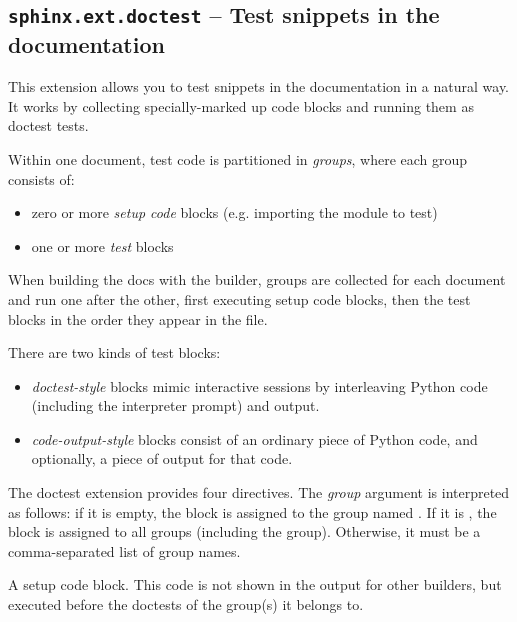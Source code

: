 \documentclass[letterpaper,10pt,english]{sphinxmanual}
\begin{document}
\subsection{\texttt{sphinx.ext.doctest} -- Test snippets in the documentation}
\label{ext/doctest:module-sphinx.ext.doctest}\label{ext/doctest:sphinx-ext-doctest-test-snippets-in-the-documentation}\label{ext/doctest::doc}
This extension allows you to test snippets in the documentation in a natural
way.  It works by collecting specially-marked up code blocks and running them as
doctest tests.

Within one document, test code is partitioned in \emph{groups}, where each group
consists of:
\begin{itemize}
\item {} 
zero or more \emph{setup code} blocks (e.g. importing the module to test)

\item {} 
one or more \emph{test} blocks

\end{itemize}

When building the docs with the  builder, groups are collected for
each document and run one after the other, first executing setup code blocks,
then the test blocks in the order they appear in the file.

There are two kinds of test blocks:
\begin{itemize}
\item {} 
\emph{doctest-style} blocks mimic interactive sessions by interleaving Python code
(including the interpreter prompt) and output.

\item {} 
\emph{code-output-style} blocks consist of an ordinary piece of Python code, and
optionally, a piece of output for that code.

\end{itemize}

The doctest extension provides four directives.  The \emph{group} argument is
interpreted as follows: if it is empty, the block is assigned to the group named
.  If it is \code{*}, the block is assigned to all groups (including the
 group).  Otherwise, it must be a comma-separated list of group
names.

\begin{fulllineitems}
\label{ext/doctest:directive-testsetup}
A setup code block.  This code is not shown in the output for other builders,
but executed before the doctests of the group(s) it belongs to.

\end{fulllineitems}
\end{document}

